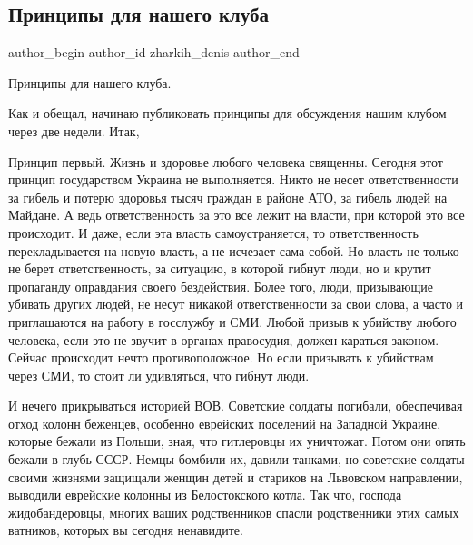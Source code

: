  
 
 
 
 
 
\subsection{Принципы для нашего клуба}
\label{sec:31_08_2014.fb.zharkih_denis.1.principy_dlja_nashego_kluba}
 
\ifcmt
 author_begin
   author_id zharkih_denis
 author_end
\fi

Принципы для нашего клуба. 

Как и обещал, начинаю публиковать принципы для обсуждения нашим клубом через
две недели. Итак, 

Принцип первый. Жизнь и здоровье любого  человека священны. Сегодня этот
принцип государством Украина не выполняется. Никто не несет ответственности за
гибель и потерю здоровья тысяч граждан в районе АТО, за гибель людей на
Майдане.   А ведь ответственность за это все лежит на власти, при которой это
все происходит. И даже, если эта власть самоустраняется, то ответственность
перекладывается на новую власть, а не исчезает сама собой. Но власть не только
не берет ответственность, за ситуацию, в которой гибнут люди, но и крутит
пропаганду оправдания своего бездействия. Более того, люди, призывающие убивать
других людей, не несут никакой ответственности за свои слова, а часто и
приглашаются на работу в госслужбу и СМИ. Любой призыв к убийству любого
человека, если это не звучит в органах правосудия, должен караться законом.
Сейчас происходит нечто противоположное. Но если призывать к убийствам через
СМИ, то стоит ли удивляться, что гибнут люди. 

И нечего прикрываться историей ВОВ. Советские солдаты погибали, обеспечивая
отход колонн беженцев, особенно еврейских поселений на Западной Украине,
которые бежали из Польши, зная, что гитлеровцы их уничтожат. Потом они опять
бежали в глубь СССР. Немцы бомбили их, давили танками, но советские солдаты
своими жизнями защищали женщин детей и стариков на Львовском направлении,
выводили еврейские колонны из Белостокского котла. Так что, господа
жидобандеровцы, многих ваших родственников спасли родственники этих самых
ватников, которых вы сегодня ненавидите. 

